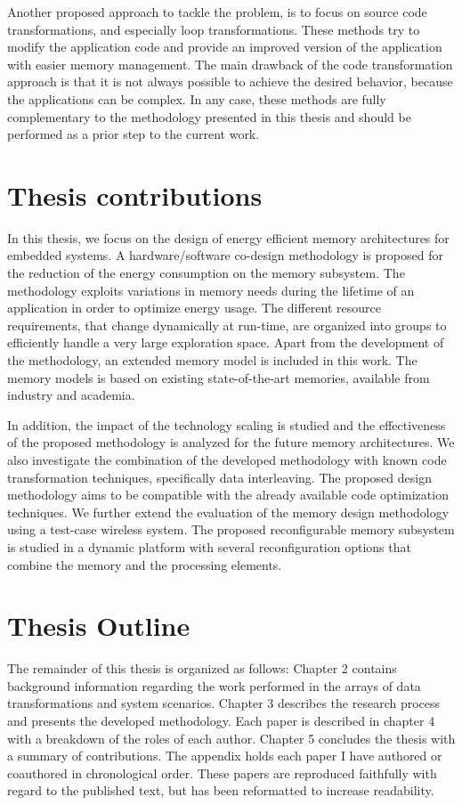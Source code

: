 Another proposed approach to tackle the problem, is to focus on source code transformations, and especially loop transformations.
These methods try to modify the application code and provide an improved version of the application with easier memory management.
The main drawback of the code transformation approach is that it is not always possible to achieve the desired behavior, because the applications can be complex.
In any case, these methods are fully complementary to the methodology presented in this thesis and should be performed as a prior step to the current work. 

\section{Thesis contributions}

In this thesis, we focus on the design of energy efficient memory architectures for embedded systems.
A hardware/software co-design methodology is proposed for the reduction of the energy consumption on the memory subsystem. 
The  methodology exploits variations in memory needs during the lifetime of an application in order to optimize energy usage. 
The different resource requirements, that change dynamically at run-time, are organized into groups to efficiently handle a very large exploration space.
Apart from the development of the methodology, an extended memory model is included in this work. 
The memory models is based on existing state-of-the-art memories, available from industry and academia.

In addition, the impact of the technology scaling is studied and the effectiveness of the proposed methodology is analyzed for the future memory architectures.
We also investigate the combination of the developed methodology with known code transformation techniques, specifically data interleaving.
The proposed design methodology aims to be compatible with the already available code optimization techniques.
We further extend the evaluation of the memory design methodology using a test-case wireless system.
The proposed reconfigurable memory subsystem is studied in a dynamic platform with several reconfiguration options that combine the memory and the processing elements.

\section{Thesis Outline}

The remainder of this thesis is organized as follows: Chapter 2 contains background information regarding the work performed in the arrays of data transformations and system scenarios. 
Chapter 3 describes the research process and presents the developed methodology.
Each paper is described in chapter 4 with a breakdown of the roles of each author. 
Chapter 5 concludes the thesis with a summary of contributions. 
The appendix holds each paper I have authored or coauthored in chronological order. 
These papers are reproduced faithfully with regard to the published text, but has been reformatted to increase readability.
